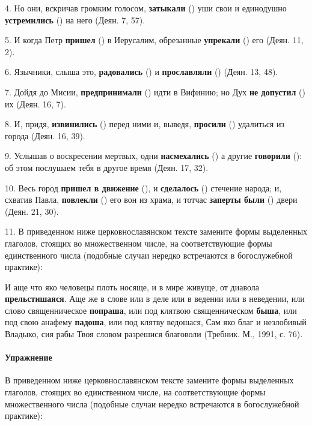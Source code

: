 \documentclass[11pt,a4paper,oneside]{memoir}
\begin{document}
    4. Но они, вскричав громким голосом, \textbf{затыкали} ({}) уши свои и единодушно \textbf{устремились} ({}) на него (Деян. 7, 57).
    
    5. И когда Петр \textbf{пришел} ({}) в Иерусалим, обрезанные \textbf{упрекали} ({}) его (Деян. 11, 2).
    
    6. Язычники, слыша это, \textbf{радовались} ({}) и \textbf{прославляли} ({}) (Деян. 13, 48).
    
    7. Дойдя до Мисии, \textbf{предпринимали} ({}) идти в Вифинию; но Дух \textbf{не допустил} ({}) их (Деян. 16, 7).
    
    8. И, придя, \textbf{извинились} ({}) перед ними и, выведя, \textbf{просили} ({}) удалиться из города (Деян. 16, 39).
    
    9. Услышав о воскресении мертвых, одни \textbf{насмехались} ({}) а другие \textbf{говорили} ({}): об этом послушаем тебя в другое время (Деян. 17, 32).
    
    10. Весь город \textbf{пришел в движение} ({}), и \textbf{сделалось} ({}) стечение народа; и, схватив Павла, \textbf{повлекли} ({}) его вон из храма, и тотчас \textbf{заперты были} ({}) двери (Деян. 21, 30).
    
    11. В приведенном ниже церковнославянском тексте замените формы выделенных глаголов, стоящих во множественном числе, на соответствующие формы единственного числа (подобные случаи нередко встречаются в богослужебной практике):
    
    И аще что яко человецы плоть носяще, и в мире живуще, от диавола \textbf{прельстишаяся}. Аще же в слове или в деле или в ведении или в неведении, или слово священническое \textbf{попраша}, или под клятвою священническом \textbf{быша}, или под свою анафему \textbf{падоша}, или под клятву ведошася, Сам яко благ и незлобивый Владыко, сия рабы Твоя словом разрешися благоволи (Требник. М., 1991, с. 76).

                    \paragraph{Упражнение}
                    
    В приведенном ниже церковнославянском тексте замените формы выделенных глаголов, стоящих во единственном числе, на соответствующие формы множественного числа (подобные случаи нередко встречаются в богослужебной практике):
    
\end{document}
